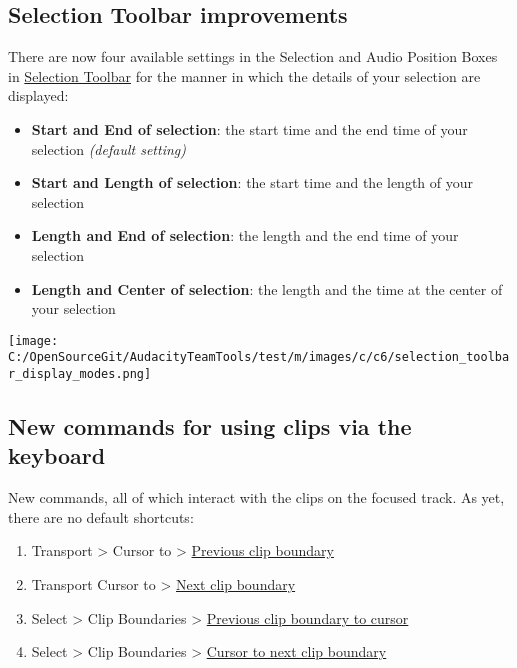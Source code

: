 \begin{multicols}{2}
\label{new_features_in_this_release_selection}
\subsection{Selection Toolbar improvements}There are now four available settings in the Selection and Audio Position Boxes in 
\hyperref[\foo{selection_toolbar_}]{Selection Toolbar}
 for the  manner in which the details of your selection are displayed:

\begin{itemize}
\item \textbf{Start and End of selection}: the start time and the end time of your selection \textit{(default setting)}
\item \textbf{Start and Length of selection}: the start time and the length of your selection
\item \textbf{Length and End of selection}: the length and the end time of your selection
\item \textbf{Length and Center of selection}: the length and the time at the center of your selection
\end{itemize}
\par \protect\texttt{[image: C:/OpenSourceGit/AudacityTeamTools/test/m/images/c/c6/selection\_toolbar\_display\_modes.png]}\par 
\label{new_features_in_this_release_clips}
\subsection{New commands for using clips via the keyboard}New commands, all of which interact with the clips on the focused track. As yet, there are no default shortcuts:

\begin{enumerate}
\item Transport > Cursor to > 
\hyperref[\foo{transport_menu_cursor_to_previous_clip_boundary}]{Previous clip boundary}

\item Transport Cursor to > 
\hyperref[\foo{transport_menu_cursor_to_next_clip_boundary}]{Next clip boundary}

\item Select > Clip Boundaries > 
\hyperref[\foo{select_menu_clip_boundaries_previous_clip_boundary_to_cursor}]{Previous clip boundary to cursor}

\item Select > Clip Boundaries > 
\hyperref[\foo{select_menu_clip_boundaries_cursor_to_next_clip_boundary}]{Cursor to next clip boundary}


\end{enumerate}
\end{multicols}
